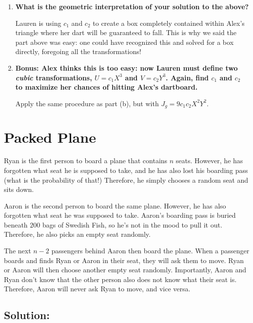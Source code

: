 \documentclass{article}
\begin{document}
\begin{enumerate}[label=(\alph*)]
    \vspace{2cm}
    
    \item \textbf{What is the geometric interpretation of your solution to the above?}

    Lauren is using $c_1$ and $c_2$ to create a box completely contained
    within Alex's triangle where her dart will be guaranteed to fall. This is why we said
    the part above was easy: one could have recognized this and solved for a box directly,
    foregoing all the transformations!

    \vspace{2cm}
        
    \item \textbf{Bonus: Alex thinks this is too easy: now Lauren must define two \textit{cubic}
    transformations, $U = c_1 X^3$ and $V = c_2 Y^3$. Again, find $c_1$ and $c_2$
    to maximize her chances of hitting Alex's dartboard.}

    Apply the same procedure as part (b), but with $J_g = 9c_1c_2 X^2 Y^2$.
    
\end{enumerate}

\newpage

\section{Packed Plane}

Ryan is the first person to board a plane that contains $n$ seats. However, he has forgotten what seat he is supposed to take, and he has also lost his boarding pass (what is the probability of that!) Therefore, he simply chooses a random seat and sits down.

Aaron is the second person to board the same plane. However, he has also forgotten what seat he was supposed to take. Aaron's boarding pass is buried beneath $200$ bags of Swedish Fish, so he's not in the mood to pull it out. Therefore, he also picks an empty seat randomly.

The next $n - 2$ passengers behind Aaron then board the plane. When a passenger boards and finds Ryan or Aaron in their seat, they will ask them to move. Ryan or Aaron will then choose another empty seat randomly. Importantly, Aaron and Ryan don't know that the other person also does not know what their seat is. Therefore, Aaron will never ask Ryan to move, and vice versa.

\subsection{Solution:}
\end{document}
